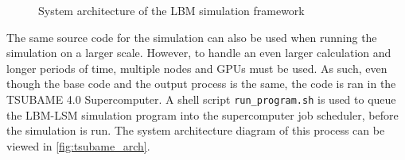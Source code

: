 \begin{figure}[H]
    \caption{System architecture of the LBM simulation framework}
    \label{fig:sys_arch}
\end{figure}

The same source code for the simulation can also be used when running the simulation on a larger scale. However, to handle an even larger calculation and longer periods of time, multiple nodes and GPUs must be used. As such, even though the base code and the output process is the same, the code is ran in the TSUBAME 4.0 Supercomputer. A shell script \texttt{run\_program.sh} is used to queue the LBM-LSM simulation program into the supercomputer job scheduler, before the simulation is run. The system architecture diagram of this process can be viewed in \autoref{fig:tsubame_arch}.


